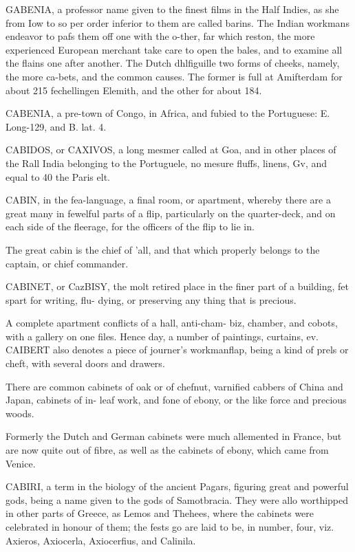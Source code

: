GABENIA, a professor name given to the finest films in the Half Indies, as she from Iow to so per order inferior to them are called barins. The Indian workmans endeavor to pafs them off one with the o-ther, far which reston, the more experienced European merchant take care to open the bales, and to examine all the flains one after another. The Dutch dhlfiguille two forms of cheeks, namely, the more ca-bets, and the common causes. The former is full at Amifterdam for about 215 fechellingen Elemith, and the other for about 184.\par\medskip
CABENIA, a pre-town of Congo, in Africa, and fubied to the Portuguese: E. Long-129, and B. lat. 4.\par\medskip
CABIDOS, or CAXIVOS, a long mesmer called at Goa, and in other places of the Rall India belonging to the Portuguele, no mesure fluffs, linens, Gv, and equal to 40 the Paris elt.\par\medskip
CABIN, in the fea-language, a final room, or apartment, whereby there are a great many in fewelful parts of a flip, particularly on the quarter-deck, and on each side of the fleerage, for the officers of the flip to lie in.\par\medskip
The great cabin is the chief of ’all, and that which properly belongs to the captain, or chief commander.\par\medskip
CABINET, or CazBISY, the molt retired place in the finer part of a building, fet spart for writing, flu- dying, or preserving any thing that is precious.\par\medskip
A complete apartment conflicts of a hall, anti-cham- biz, chamber, and cobots, with a gallery on one files. Hence day, a number of paintings, curtains, ev. CAIBERT also denotes a piece of journer's workmanflap, being a kind of prels or cheft, with several doors and drawers.\par\medskip
There are common cabinets of oak or of chefnut, varnified cabbers of China and Japan, cabinets of in- leaf work, and fone of ebony, or the like force and precious woods.\par\medskip
Formerly the Dutch and German cabinets were much allemented in France, but are now quite out of fibre, as well as the cabinets of ebony, which came from Venice.\par\medskip
CABIRI, a term in the biology of the ancient Pagars, figuring great and powerful gods, being a name given to the gods of Samotbracia. They were allo worthipped in other parts of Greece, as Lemos and Thehees, where the cabinets were celebrated in honour of them; the fests go are laid to be, in number, four, viz. Axieros, Axiocerla, Axiocerfius, and Calinila.\par\medskip
